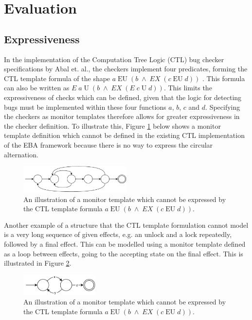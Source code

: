 \section{Evaluation}

\subsection{Expressiveness}

In the implementation of the Computation Tree Logic (CTL) bug checker specifications by Abal et. al., the checkers implement four predicates, forming the CTL template formula of the shape $a\;\text{EU}\;(b\;\land\;EX\;(c\;\text{EU}\;d))$ \cite{Abal2017EffectiveBF}\cite{research-project}. This formula can also be written as $E\;a\;\text{U}\;(b\;\land\;EX\;(E\;c\;\text{U}\;d))$. This limits the expressiveness of checks which can be defined, given that the logic for detecting bugs must be implemented within these four functions $a$, $b$, $c$ and $d$. Specifying the checkers as monitor templates therefore allows for greater expressiveness in the checker definition. To illustrate this, Figure \ref{expressive-monitor} below shows a monitor template definition which cannot be defined in the existing CTL implementation of the EBA framework because there is no way to express the circular alternation.

\begin{figure}[H]
    \centering
    \includegraphics[width=0.5\textwidth]{evaluation/figures/monitor}
    \caption{An illustration of a monitor template which cannot be expressed by the CTL template formula $a\;\text{EU}\;(b\;\land\;EX\;(c\;\text{EU}\;d))$.}
    \label{expressive-monitor}
\end{figure}

\newpar Another example of a structure that the CTL template formulation cannot model is a very long sequence of given effects, e.g. an unlock and a lock repeatedly, followed by a final effect. This can be modelled using a monitor template defined as a loop between effects, going to the accepting state on the final effect. This is illustrated in Figure \ref{long-monitor}. 

\begin{figure}[H]
    \centering
    \includegraphics[width=0.35\textwidth]{evaluation/figures/long-monitor}
    \caption{An illustration of a monitor template which cannot be expressed by the CTL template formula $a\;\text{EU}\;(b\;\land\;EX\;(c\;\text{EU}\;d))$.}
    \label{long-monitor}
\end{figure}

